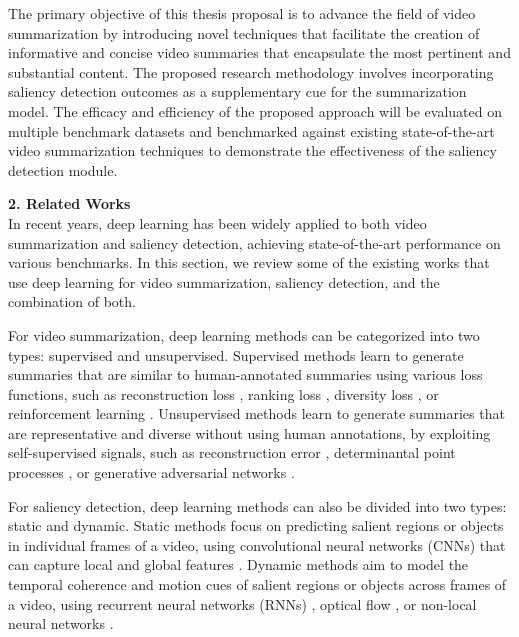 \documentclass[14pt]{extarticle}
\begin{document}
    The primary objective of this thesis proposal is to advance the field of video summarization by introducing novel techniques that facilitate the creation of informative and concise video summaries that encapsulate the most pertinent and substantial content. The proposed research methodology involves incorporating saliency detection outcomes as a supplementary cue for the summarization model. The efficacy and efficiency of the proposed approach will be evaluated on multiple benchmark datasets and benchmarked against existing state-of-the-art video summarization techniques to demonstrate the effectiveness of the saliency detection module.

    \vspace{.5cm}
    \textbf{2. Related Works} \\
    In recent years, deep learning has been widely applied to both video summarization and saliency detection, achieving state-of-the-art performance on various benchmarks. In this section, we review some of the existing works that use deep learning for video summarization, saliency detection, and the combination of both.

    For video summarization, deep learning methods can be categorized into two types: supervised and unsupervised. Supervised methods learn to generate summaries that are similar to human-annotated summaries using various loss functions, such as reconstruction loss \cite{zhang2016lstm}, ranking loss \cite{song2015tvsum}, diversity loss \cite{zhou2018deepinterest}, or reinforcement learning \cite{zhang2018retrospective}. Unsupervised methods learn to generate summaries that are representative and diverse without using human annotations, by exploiting self-supervised signals, such as reconstruction error \cite{mahasseni2017unsupervised}, determinantal point processes \cite{gong2014diverse}, or generative adversarial networks \cite{wei2018unsupervised}.
    
    For saliency detection, deep learning methods can also be divided into two types: static and dynamic. Static methods focus on predicting salient regions or objects in individual frames of a video, using convolutional neural networks (CNNs) that can capture local and global features \cite{li2015visual}. Dynamic methods aim to model the temporal coherence and motion cues of salient regions or objects across frames of a video, using recurrent neural networks (RNNs) \cite{wang2015saliency}, optical flow \cite{bak2017spatio}, or non-local neural networks \cite{shokri2018salient}.
    
\end{document}

